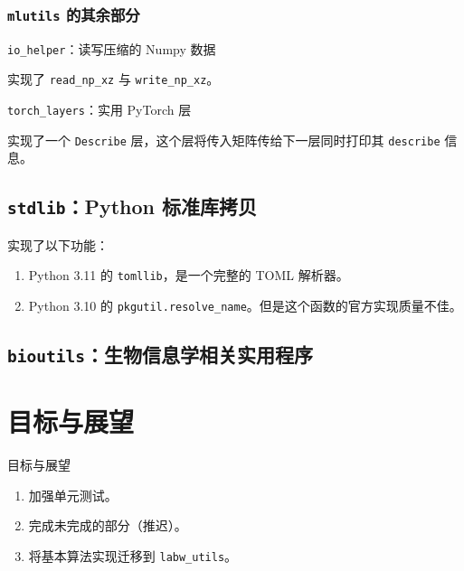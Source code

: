 \documentclass[pdf,9pt]{beamer}
\newcommand{\lu}{\texttt{labw\_utils}}
\begin{document}
    \subsubsection{\texttt{mlutils} 的其余部分}

    \begin{frame}[fragile]{\subsubsecname}

        \texttt{io\_helper}：读写压缩的 Numpy 数据
        
        \hspace*{2em} 实现了 \Verb|read_np_xz| 与 \Verb|write_np_xz|。

        \texttt{torch\_layers}：实用 PyTorch 层

        \hspace*{2em} 实现了一个 \Verb|Describe| 层，这个层将传入矩阵传给下一层同时打印其 \Verb|describe| 信息。
    \end{frame}
    \subsection{\texttt{stdlib}：Python 标准库拷贝}

    \begin{frame}[fragile]{\subsecname}
        实现了以下功能：

        \begin{enumerate}
            \item Python 3.11 的 \Verb|tomllib|，是一个完整的 TOML 解析器。
            \item Python 3.10 的 \Verb|pkgutil.resolve_name|。但是这个函数的官方实现质量不佳。
        \end{enumerate}
    \end{frame}

    \subsection{\texttt{bioutils}：生物信息学相关实用程序}

    \section{目标与展望}

    \begin{frame}
        \sectionpage
    \end{frame}

    \begin{frame}{目标与展望}
        \begin{enumerate}
            \item 加强单元测试。
            \item 完成未完成的部分（推迟）。
            \item 将基本算法实现迁移到 \lu{}。
        \end{enumerate}
    \end{frame}
\end{document}
